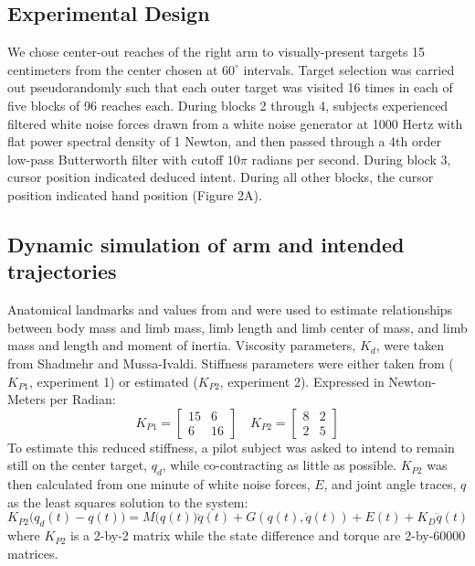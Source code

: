\documentclass{frontiersSCNS} %
\begin{document}
\begin{methods}
\subsection{Experimental Design}
We chose center-out reaches of the right arm to visually-present targets 15 centimeters from the center chosen at $60^\circ$ intervals. Target selection was carried out pseudorandomly such that each outer target was visited 16 times in each of five blocks of 96 reaches each. During blocks 2 through 4, subjects experienced filtered white noise forces drawn from a white noise generator at 1000 Hertz with flat power spectral density of 1 Newton, and then passed through a 4th order low-pass Butterworth filter with cutoff $10 \pi$ radians per second. During block 3, cursor position indicated deduced intent. During all other blocks, the cursor position indicated hand position (Figure 2A).

\subsection{Dynamic simulation of arm and intended trajectories}
Anatomical landmarks and values from \cite{dempster1955space} and \cite{winter2009biomechanics} were used to estimate relationships between body mass and limb mass, limb length and limb center of mass, and limb mass and length and moment of inertia. Viscosity parameters, $K_d$, were taken from Shadmehr and Mussa-Ivaldi\cite{shadmehr1994adaptive}. Stiffness parameters were either taken from \cite{shadmehr1994adaptive} ($K_{P1}$, experiment 1) or estimated ($K_{P2}$, experiment 2). Expressed in Newton-Meters per Radian:
\begin{equation}
K_{P1}=
\begin{bmatrix}
15 & 6 \\
6 & 16
\end{bmatrix}
\quad
K_{P2}=
\begin{bmatrix}
8 & 2 \\
2 & 5
\end{bmatrix}
\end{equation}
To estimate this reduced stiffness, a pilot subject was asked to intend to remain still on the center target, $q_d$, while co-contracting as little as possible. $K_{P2}$ was then calculated from one minute of white noise forces, $E$, and joint angle traces, $q$ as the least squares solution to the system:
\begin{equation}
K_{P2}\big(q_d(t)-q(t)\big)=M\big(q(t)\big)\ddot{q}(t)+G(q(t),\dot{q}(t))+E(t)+K_D\dot{q}(t)
\end{equation}
where $K_{P2}$ is a 2-by-2 matrix while the state difference and torque are 2-by-60000 matrices.


\end{methods}
\end{document}
